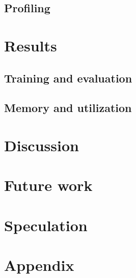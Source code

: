 \documentclass[sigconf]{acmart}
\begin{document}
\subsection{Profiling}\label{subsec:profiling}

\section{Results}\label{sec:results}

\subsection{Training and evaluation}\label{subsec:training-and-evaluation}

\subsection{Memory and utilization}\label{subsec:memory-and-utilization}

\section{Discussion}\label{sec:discussion}

\section{Future work}\label{sec:futurework}
\section{Speculation}\label{sec:speculation}




\appendix
\appendixpage
\addappheadtotoc

\section{Appendix}\label{sec:appendix}

%
\end{document}
